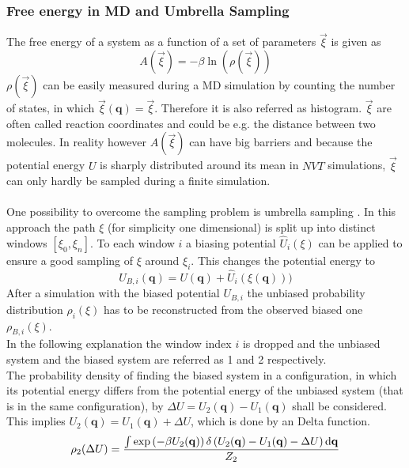 \subsubsection{Free energy in MD and Umbrella Sampling}
The free energy of a system as a function of a set of parameters $\vec{\xi}$ is given as
\begin{equation}
\label{eq:free_energy_from_rho}
A(\vec{\xi}) = - \beta \ln\left(\rho(\vec{\xi})\right)
\end{equation}
$\rho(\vec{\xi})$ can be easily measured during a MD simulation by counting the number of states, in which $\vec{\xi}(\mathbf{q}) = \vec{\xi}$. Therefore it is also referred as histogram. $\vec{\xi}$ are often called reaction coordinates and could be e.g. the distance between two molecules.
In reality however $A(\vec{\xi})$ can have big barriers and because the potential energy $U$ is sharply distributed around its mean in $NVT$ simulations, $\vec{\xi}$ can only hardly be sampled during a finite simulation.\\
\\
One possibility to overcome the sampling problem is umbrella sampling \autocite{originalUmbrellaSampling}. In this approach the path $\xi$ (for simplicity one dimensional) is split up into distinct windows $[\xi_0, \xi_n]$. To each window $i$ a biasing potential $\hat{U}_i(\xi)$ can be applied to ensure a good sampling of $\xi$ around $\xi_i$. This changes the potential energy to
\begin{equation}
U_{B, i}(\mathbf{q}) = U(\mathbf{q}) + \hat{U}_i(\xi(\mathbf{q})))
\end{equation}
After a simulation with the biased potential $U_{B, i}$ the unbiased probability distribution $\rho_i(\xi)$ has to be reconstructed from the observed biased one $\rho_{B, i}(\xi)$.\\
In the following explanation the window index $i$ is dropped and the unbiased system and the biased system are referred as 1 and 2 respectively.\\
The probability density of finding the biased system in a configuration, in which its potential energy differs from the potential energy of the unbiased system (that is in the same configuration), by $\Delta U = U_2(\mathbf{q}) - U_1(\mathbf{q})$ shall be considered. This implies $U_2(\mathbf{q}) = U_1(\mathbf{q}) + \Delta U$, which is done by an Delta function.
\begin{align}
\rho_2(\Delta U) = \frac{\int \exp\left(-\beta U_2(\mathbf{q})\right) \delta\left(U_2(\mathbf{q}) - U_1(\mathbf{q}) - \Delta U\right) \text{d} \mathbf{q}}{Z_2}
\end{align}
